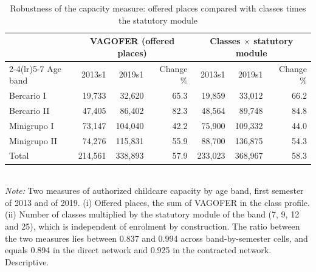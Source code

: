 \begin{table}[htbp]\centering
\caption{Robustness of the capacity measure: offered places compared with classes times the statutory module}
\label{tab:R_capcheck}
\small
\begin{tabular}{lrrrrrr}
\toprule
& \multicolumn{3}{c}{VAGOFER (offered places)} & \multicolumn{3}{c}{Classes $\times$ statutory module} \\
\cmidrule(lr){2-4}\cmidrule(lr){5-7}
Age band & 2013s1 & 2019s1 & Change \% & 2013s1 & 2019s1 & Change \% \\
\midrule
Bercario I & 19,733 & 32,620 & 65.3 & 19,859 & 33,012 & 66.2 \\
Bercario II & 47,405 & 86,402 & 82.3 & 48,564 & 89,748 & 84.8 \\
Minigrupo I & 73,147 & 104,040 & 42.2 & 75,900 & 109,332 & 44.0 \\
Minigrupo II & 74,276 & 115,831 & 55.9 & 88,700 & 136,875 & 54.3 \\
\midrule
Total & 214,561 & 338,893 & 57.9 & 233,023 & 368,967 & 58.3 \\
\bottomrule
\end{tabular}
\\[3pt]{\footnotesize \textit{Note:} Two measures of authorized childcare capacity by age band, first semester of 2013 and of 2019. (i) Offered places, the sum of VAGOFER in the class profile. (ii) Number of classes multiplied by the statutory module of the band (7, 9, 12 and 25), which is independent of enrolment by construction. The ratio between the two measures lies between 0.837 and 0.994 across band-by-semester cells, and equals 0.894 in the direct network and 0.925 in the contracted network. Descriptive.}
\end{table}
